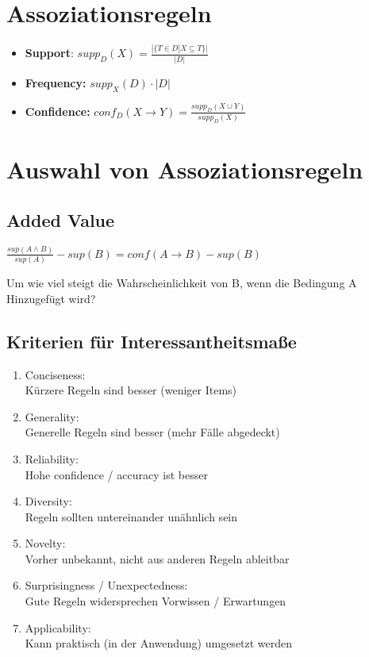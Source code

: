 \documentclass{article}
\begin{document}
\section{Assoziationsregeln}
\begin{itemize}
    \item \textbf{Support}: $supp_D(X) = \frac{|\{ T \in D |X \subseteq T\}|}{|D|}$
    \item \textbf{Frequency:} $supp_X(D) \cdot |D|$
    \item \textbf{Confidence:} $conf_D(X \rightarrow Y) = \frac{supp_D(X \cup Y)}{supp_D(X)}$
\end{itemize}
\section{Auswahl von Assoziationsregeln}
\subsection{Added Value}
\begin{center}
    $
        \frac{sup (A \land B)}{sup (A)} - sup(B) = conf(A \rightarrow B) - sup(B)
    $
\end{center}
Um wie viel steigt die Wahrscheinlichkeit von B, wenn die Bedingung A
Hinzugefügt wird?
\subsection{Kriterien für Interessantheitsmaße}
\begin{enumerate}
    \item Conciseness: \\
    Kürzere Regeln sind besser (weniger Items)
    \item Generality: \\
    Generelle Regeln sind besser (mehr Fälle abgedeckt)
    \item Reliability: \\
    Hohe confidence / accuracy ist besser
    \item Diversity: \\
    Regeln sollten untereinander unähnlich sein
    \item Novelty: \\
    Vorher unbekannt, nicht aus anderen Regeln ableitbar
    \item Surprisingness / Unexpectedness: \\
    Gute Regeln widersprechen Vorwissen / Erwartungen
    \item Applicability: \\ 
    Kann praktisch (in der Anwendung) umgesetzt werden
\end{enumerate}
\end{document}
